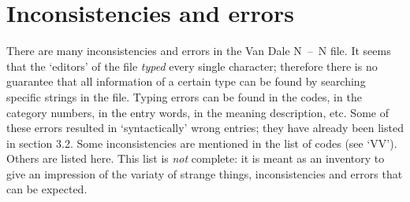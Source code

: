\section{Inconsistencies and errors}
There are many inconsistencies and errors in the Van Dale N~--~N file. It seems 
that the `editors' of the file {\em typed} every single character; therefore 
there is no guarantee that all information of a certain type can be found by 
searching specific strings in the file. Typing errors can be found in the
codes, in the category numbers, in the entry words, in the meaning description,
etc. Some of these errors resulted in `syntactically' wrong entries; they have 
already been listed in section 3.2. Some inconsistencies are mentioned in 
the list of codes (see `VV'). Others are listed here. This list is 
{\em not} complete: it is meant as an inventory to give an impression of
the variaty of strange things, inconsistencies and errors that can be expected.
